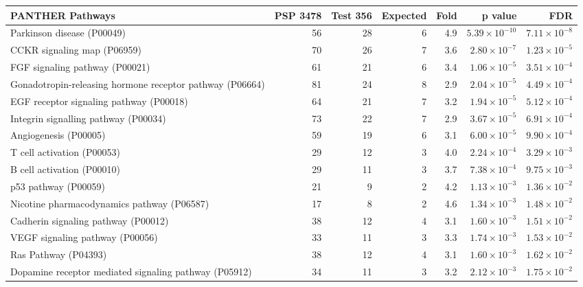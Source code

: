 \begin{table}[ht]
\centering
\begin{adjustbox}{width=\textwidth}
\begin{tabular}{lrrrrrr}
  \hline
PANTHER Pathways & PSP 3478 & Test 356 & Expected & Fold & p value & FDR \\ 
  \hline
Parkinson disease (P00049) & 56 & 28 & 6 & 4.9 & $5.39 \times 10^{-10}$ & $7.11 \times 10^{-8}$ \\ 
  CCKR signaling map (P06959) & 70 & 26 & 7 & 3.6 & $2.80 \times 10^{-7}$ & $1.23 \times 10^{-5}$ \\ 
  FGF signaling pathway (P00021) & 61 & 21 & 6 & 3.4 & $1.06 \times 10^{-5}$ & $3.51 \times 10^{-4}$ \\ 
  Gonadotropin-releasing hormone receptor pathway (P06664) & 81 & 24 & 8 & 2.9 & $2.04 \times 10^{-5}$ & $4.49 \times 10^{-4}$ \\ 
  EGF receptor signaling pathway (P00018) & 64 & 21 & 7 & 3.2 & $1.94 \times 10^{-5}$ & $5.12 \times 10^{-4}$ \\ 
  Integrin signalling pathway (P00034) & 73 & 22 & 7 & 2.9 & $3.67 \times 10^{-5}$ & $6.91 \times 10^{-4}$ \\ 
  Angiogenesis (P00005) & 59 & 19 & 6 & 3.1 & $6.00 \times 10^{-5}$ & $9.90 \times 10^{-4}$ \\ 
  T cell activation (P00053) & 29 & 12 & 3 & 4.0 & $2.24 \times 10^{-4}$ & $3.29 \times 10^{-3}$ \\ 
  B cell activation (P00010) & 29 & 11 & 3 & 3.7 & $7.38 \times 10^{-4}$ & $9.75 \times 10^{-3}$ \\ 
  p53 pathway (P00059) & 21 & 9 & 2 & 4.2 & $1.13 \times 10^{-3}$ & $1.36 \times 10^{-2}$ \\ 
  Nicotine pharmacodynamics pathway (P06587) & 17 & 8 & 2 & 4.6 & $1.34 \times 10^{-3}$ & $1.48 \times 10^{-2}$ \\ 
  Cadherin signaling pathway (P00012) & 38 & 12 & 4 & 3.1 & $1.60 \times 10^{-3}$ & $1.51 \times 10^{-2}$ \\ 
  VEGF signaling pathway (P00056) & 33 & 11 & 3 & 3.3 & $1.74 \times 10^{-3}$ & $1.53 \times 10^{-2}$ \\ 
  Ras Pathway (P04393) & 38 & 12 & 4 & 3.1 & $1.60 \times 10^{-3}$ & $1.62 \times 10^{-2}$ \\ 
  Dopamine receptor mediated signaling pathway (P05912) & 34 & 11 & 3 & 3.2 & $2.12 \times 10^{-3}$ & $1.75 \times 10^{-2}$ \\ 

\end{tabular}
\end{adjustbox}
\end{table}
